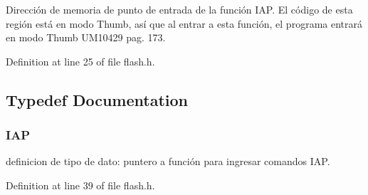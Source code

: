 Dirección de memoria de punto de entrada de la función I\+AP. El código de esta región está en modo Thumb, así que al entrar a esta función, el programa entrará en modo Thumb U\+M10429 pag. 173. 



Definition at line 25 of file flash.\+h.



\subsection{Typedef Documentation}
\subsubsection[{\texorpdfstring{I\+AP}{IAP}}]{\setlength{\rightskip}{0pt plus 5cm}I\+AP}\hypertarget{group___i_a_p_ga2874bcf0af02828d8bf944fd740ac986}{}\label{group___i_a_p_ga2874bcf0af02828d8bf944fd740ac986}


definicion de tipo de dato\+: puntero a función para ingresar comandos I\+AP. 



Definition at line 39 of file flash.\+h.

